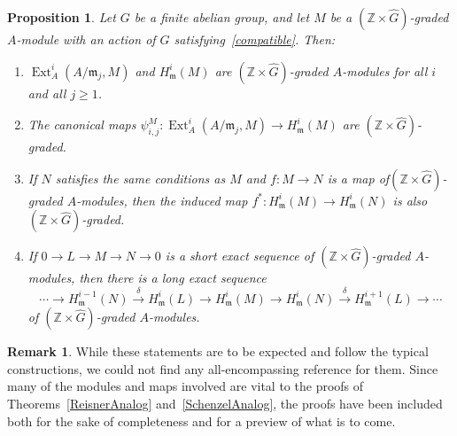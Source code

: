 \documentclass[10pt]{amsart}
\newtheorem{prop}[theo]{Proposition}
\theoremstyle{definition}
\newtheorem{rema}[theo]{Remark}
\DeclareMathOperator{\Ext}{Ext}
\newcommand{\ZZ}{{\mathbb Z}}
\newcommand{\mideal}{\ensuremath{\mathfrak{m}}}
\newcommand*{\alphenumi}{\renewcommand*{\theenumi}{\alph{enumi}}}
\begin{document}
\begin{prop}\label{extcohograding}
Let $G$ be a finite abelian group, and let $M$ be a $(\ZZ\times\hat{G})$-graded $A$-module with an action of $G$ satisfying~\eqref{compatible}. Then:
\begin{enumerate}%
\item \label{2.1.a} $\Ext_A^i(A/\mideal_j, M)$ and $H_\mideal^i(M)$ are $(\ZZ\times\hat{G})$-graded $A$-modules for all $i$ and all $j\ge 1$.
\item \label{2.1.b} The canonical maps $\psi_{i, j}^M:\Ext_A^i(A/\mideal_j, M)\to H_\mideal^i(M)$ are $(\ZZ\times\hat{G})$-graded.
\item \label{2.1.c} If $N$ satisfies the same conditions as $M$ and $f:M\to N$ is a map of\linebreak $(\ZZ\times\hat{G})$-graded $A$-modules, then the induced map $f^*:H_\mideal^i(M)\to H_\mideal^i(N)$ is also $(\ZZ\times\hat{G})$-graded.
\item \label{2.1.d} If $0\to L\to M\to N\to 0$ is a short exact sequence of $(\ZZ\times\hat{G})$-graded $A$-modules, then there is a long exact sequence
\[
\cdots\to H_\mideal^{i-1}(N)\xrightarrow{\delta} H_\mideal^i(L)\to H_\mideal^i(M)\to H_\mideal^i(N)
\xrightarrow{\delta} H_\mideal^{i+1}(L)\to\cdots
\]
of $(\ZZ\times\hat{G})$-graded $A$-modules.
\end{enumerate}
\end{prop}

\begin{rema}
While these statements are to be expected and follow the typical constructions, we could not find any all-encompassing reference for them. Since many of the modules and maps involved are vital to the proofs of Theorems~\ref{ReisnerAnalog} and~\ref{SchenzelAnalog}, the proofs have been included both for the sake of completeness and for a preview of what is to come.
\end{rema}
\end{document}
